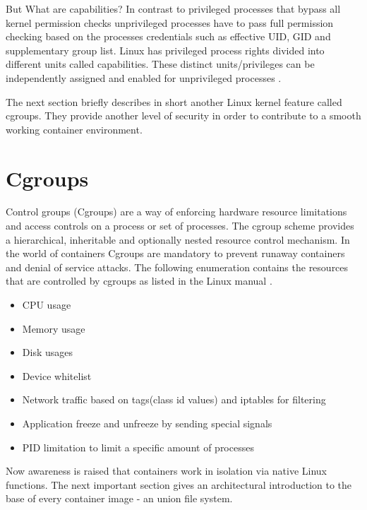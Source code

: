 But What are capabilities? In contrast to privileged processes that bypass all kernel permission checks unprivileged processes have to pass full permission checking based on the processes credentials such as effective UID, GID and supplementary group list. 
Linux has privileged process rights divided into different units called capabilities. These distinct units/privileges can be independently assigned and enabled for unprivileged processes \cite{capa}.

The next section briefly describes in short another Linux kernel feature called cgroups. 
They provide another level of security in order to contribute to a smooth working container environment.

\section{Cgroups}
\label{sec:intro:containerization:cgroups}
Control groups (Cgroups) are a way of enforcing hardware resource limitations and access controls on a process or set of processes. 
The cgroup scheme provides a hierarchical, inheritable and optionally nested resource control mechanism.
In the world of containers Cgroups are mandatory to prevent runaway containers and denial of service attacks.
The following enumeration contains the resources that are controlled by cgroups as listed in the Linux manual \cite{capa}.
\begin{itemize}
\item CPU usage
\item Memory usage
\item Disk usages
\item Device whitelist
\item Network traffic based on tags(class id values) and iptables for filtering
\item Application freeze and unfreeze by sending special signals
\item PID limitation to limit a specific amount of processes 
\end{itemize}

Now awareness is raised that containers work in isolation via native Linux functions.
The next important section gives an architectural introduction to the base of every container image - an union file system.
